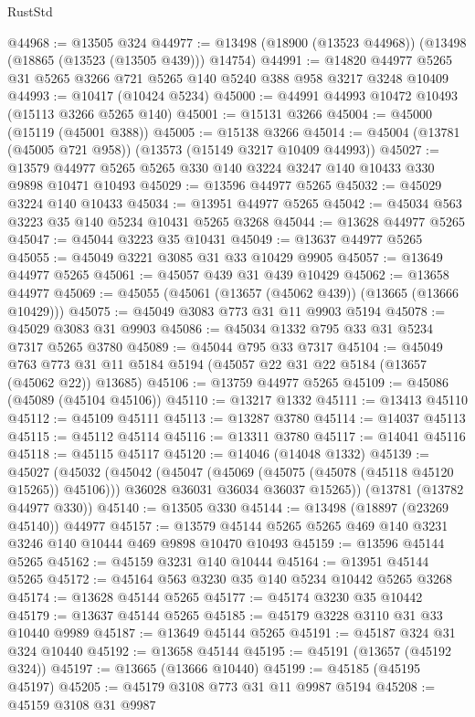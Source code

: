 \begin{lexlean}{RustStd}
\begin{coremodule}
@44968 := @13505 @324
@44977 := @13498 (@18900 (@13523 @44968)) (@13498 (@18865 (@13523 (@13505 @439))) @14754)
@44991 := @14820 @44977 @5265 @31 @5265 @3266 @721 @5265 @140 @5240 @388 @958 @3217 @3248 @10409
@44993 := @10417 (@10424 @5234)
@45000 := @44991 @44993 @10472 @10493 (@15113 @3266 @5265 @140)
@45001 := @15131 @3266
@45004 := @45000 (@15119 (@45001 @388))
@45005 := @15138 @3266
@45014 := @45004 (@13781 (@45005 @721 @958)) (@13573 (@15149 @3217 @10409 @44993))
@45027 := @13579 @44977 @5265 @5265 @330 @140 @3224 @3247 @140 @10433 @330 @9898 @10471 @10493
@45029 := @13596 @44977 @5265
@45032 := @45029 @3224 @140 @10433
@45034 := @13951 @44977 @5265
@45042 := @45034 @563 @3223 @35 @140 @5234 @10431 @5265 @3268
@45044 := @13628 @44977 @5265
@45047 := @45044 @3223 @35 @10431
@45049 := @13637 @44977 @5265
@45055 := @45049 @3221 @3085 @31 @33 @10429 @9905
@45057 := @13649 @44977 @5265
@45061 := @45057 @439 @31 @439 @10429
@45062 := @13658 @44977
@45069 := @45055 (@45061 (@13657 (@45062 @439)) (@13665 (@13666 @10429)))
@45075 := @45049 @3083 @773 @31 @11 @9903 @5194
@45078 := @45029 @3083 @31 @9903
@45086 := @45034 @1332 @795 @33 @31 @5234 @7317 @5265 @3780
@45089 := @45044 @795 @33 @7317
@45104 := @45049
    @763
    @773
    @31
    @11
    @5184
    @5194
    (@45057 @22 @31 @22 @5184 (@13657 (@45062 @22)) @13685)
@45106 := @13759 @44977 @5265
@45109 := @45086 (@45089 (@45104 @45106))
@45110 := @13217 @1332
@45111 := @13413 @45110
@45112 := @45109 @45111
@45113 := @13287 @3780
@45114 := @14037 @45113
@45115 := @45112 @45114
@45116 := @13311 @3780
@45117 := @14041 @45116
@45118 := @45115 @45117
@45120 := @14046 (@14048 @1332)
@45139 := @45027
    (@45032
      (@45042
        (@45047 (@45069 (@45075 (@45078 (@45118 @45120 @15265)) @45106)))
        @36028
        @36031
        @36034
        @36037
        @15265))
    (@13781 (@13782 @44977 @330))
@45140 := @13505 @330
@45144 := @13498 (@18897 (@23269 @45140)) @44977
@45157 := @13579 @45144 @5265 @5265 @469 @140 @3231 @3246 @140 @10444 @469 @9898 @10470 @10493
@45159 := @13596 @45144 @5265
@45162 := @45159 @3231 @140 @10444
@45164 := @13951 @45144 @5265
@45172 := @45164 @563 @3230 @35 @140 @5234 @10442 @5265 @3268
@45174 := @13628 @45144 @5265
@45177 := @45174 @3230 @35 @10442
@45179 := @13637 @45144 @5265
@45185 := @45179 @3228 @3110 @31 @33 @10440 @9989
@45187 := @13649 @45144 @5265
@45191 := @45187 @324 @31 @324 @10440
@45192 := @13658 @45144
@45195 := @45191 (@13657 (@45192 @324))
@45197 := @13665 (@13666 @10440)
@45199 := @45185 (@45195 @45197)
@45205 := @45179 @3108 @773 @31 @11 @9987 @5194
@45208 := @45159 @3108 @31 @9987

\end{coremodule}
\end{lexlean}

